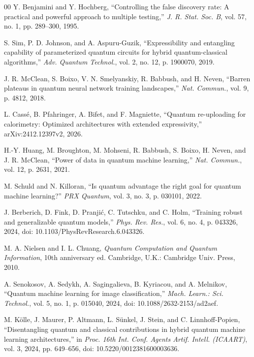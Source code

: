 \documentclass{ieeeaccess}
\begin{document}
\begin{thebibliography}{00}
 Y. Benjamini and Y. Hochberg, ``Controlling the false discovery rate: A practical and powerful approach to multiple testing,'' \emph{J. R. Stat. Soc. B}, vol. 57, no. 1, pp. 289--300, 1995.

 S. Sim, P. D. Johnson, and A. Aspuru-Guzik, ``Expressibility and entangling capability of parameterized quantum circuits for hybrid quantum-classical algorithms,'' \emph{Adv. Quantum Technol.}, vol. 2, no. 12, p. 1900070, 2019.

 J. R. McClean, S. Boixo, V. N. Smelyanskiy, R. Babbush, and H. Neven, ``Barren plateaus in quantum neural network training landscapes,'' \emph{Nat. Commun.}, vol. 9, p. 4812, 2018.

 L. Cass\'e, B. Pfahringer, A. Bifet, and F. Magniette, ``Quantum re-uploading for calorimetry: Optimized architectures with extended expressivity,'' arXiv:2412.12397v2, 2026.

 H.-Y. Huang, M. Broughton, M. Mohseni, R. Babbush, S. Boixo, H. Neven, and J. R. McClean, ``Power of data in quantum machine learning,'' \emph{Nat. Commun.}, vol. 12, p. 2631, 2021.

 M. Schuld and N. Killoran, ``Is quantum advantage the right goal for quantum machine learning?'' \emph{PRX Quantum}, vol. 3, no. 3, p. 030101, 2022.

 J. Berberich, D. Fink, D. Pranji\'c, C. Tutschku, and C. Holm, ``Training robust and generalizable quantum models,'' \emph{Phys. Rev. Res.}, vol. 6, no. 4, p. 043326, 2024, doi: 10.1103/PhysRevResearch.6.043326.

 M. A. Nielsen and I. L. Chuang, \emph{Quantum Computation and Quantum Information}, 10th anniversary ed. Cambridge, U.K.: Cambridge Univ. Press, 2010.

 A. Senokosov, A. Sedykh, A. Sagingalieva, B. Kyriacou, and A. Melnikov, ``Quantum machine learning for image classification,'' \emph{Mach. Learn.: Sci. Technol.}, vol. 5, no. 1, p. 015040, 2024, doi: 10.1088/2632-2153/ad2aef.

 M. K\"olle, J. Maurer, P. Altmann, L. S\"unkel, J. Stein, and C. Linnhoff-Popien, ``Disentangling quantum and classical contributions in hybrid quantum machine learning architectures,'' in \emph{Proc. 16th Int. Conf. Agents Artif. Intell. (ICAART)}, vol. 3, 2024, pp. 649--656, doi: 10.5220/0012381600003636.


\end{thebibliography}
\end{document}
